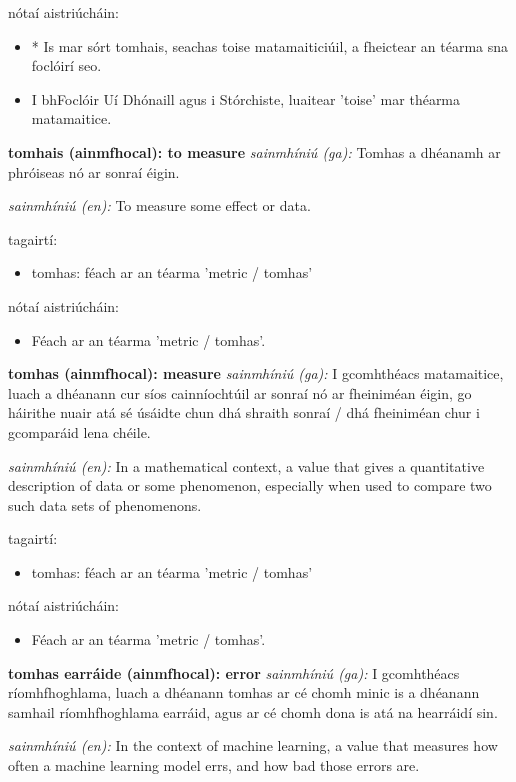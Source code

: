 \documentclass{article}
\begin{document}
nótaí aistriúcháin:
\begin{itemize}
	\item * Is mar sórt tomhais, seachas toise matamaiticiúil, a fheictear an téarma sna foclóirí seo.
	\item I bhFoclóir Uí Dhónaill agus i Stórchiste, luaitear 'toise' mar théarma matamaitice.
\end{itemize}


\textbf{tomhais (ainmfhocal): to measure}
\textit{sainmhíniú (ga):} Tomhas a dhéanamh ar phróiseas nó ar sonraí éigin.

\textit{sainmhíniú (en):} To measure some effect or data.

tagairtí:
\begin{itemize}
	\item tomhas: féach ar an téarma 'metric / tomhas'
\end{itemize}

nótaí aistriúcháin:
\begin{itemize}
	\item Féach ar an téarma 'metric / tomhas'.
\end{itemize}


\textbf{tomhas (ainmfhocal): measure}
\textit{sainmhíniú (ga):} I gcomhthéacs matamaitice, luach a dhéanann cur síos cainníochtúil ar sonraí nó ar fheiniméan éigin, go háirithe nuair atá sé úsáidte chun dhá shraith sonraí / dhá fheiniméan chur i gcomparáid lena chéile.

\textit{sainmhíniú (en):} In a mathematical context, a value that gives a quantitative description of data or some phenomenon, especially when used to compare two such data sets of phenomenons.

tagairtí:
\begin{itemize}
	\item tomhas: féach ar an téarma 'metric / tomhas'
\end{itemize}

nótaí aistriúcháin:
\begin{itemize}
	\item Féach ar an téarma 'metric / tomhas'.
\end{itemize}


\textbf{tomhas earráide (ainmfhocal): error}
\textit{sainmhíniú (ga):} I gcomhthéacs ríomhfhoghlama, luach a dhéanann tomhas ar cé chomh minic is a dhéanann samhail ríomhfhoghlama earráid, agus ar cé chomh dona is atá na hearráidí sin.

\textit{sainmhíniú (en):} In the context of machine learning, a value that measures how often a machine learning model errs, and how bad those errors are.
\end{document}

